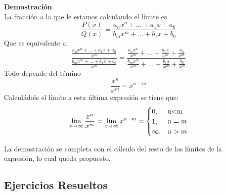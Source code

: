 \documentclass[10pt,twoside]{SelfArx} %
\begin{document}
\textbf{Demostración}\\
La fracción a la que le estamos calculando el límite es\\
\[ \frac{P(x)}{Q(x)}=\frac{a_{n} x^{n}+...+a_{1} x+a_{0}}{b_{m} x^{m}+...+b_{1} x+b_{0}} \]
Que es equivalente a:\\
\[ \frac{\frac{a_{n} x^{n}+...+a_{1} x+a_{0}}{x^{m}}}{\frac{b_{m} x^{m}+...+b_{1} x+b_{0}}{x^{m}}}= 
\frac{\frac{a_{n} x^{n}}{x^{m}}+...+\frac{a_{1} x}{x^{m}}+\frac{a_{0}}{x^{m}}}{\frac{b_{m} x^{m}}{x^{m}}+...+\frac{b_{1} x}{x^{m}}+\frac{b_{0}}{x^{m}}}
\]
Todo depende del témino\\
\[ \dfrac{x^{n}}{x^{m}}=x^{n-m} \]
Calculádole el límite a esta última expresión se tiene que:\\
\[ \lim\limits_{x\rightarrow\infty}\dfrac{x^{n}}{x^{m}}=\lim\limits_{x\rightarrow\infty}x^{n-m}=\begin{cases}
0, & \mbox{n<m} \\
1, & \mbox{$  n=m $}\\
\infty, &  \mbox{$ n>m $}\\
\end{cases}
\]


La demostración se completa con el cálculo del resto de los límites de la expresión, lo cual queda propuesto.\\



\subsection{Ejercicios Resueltos}
\end{document}
